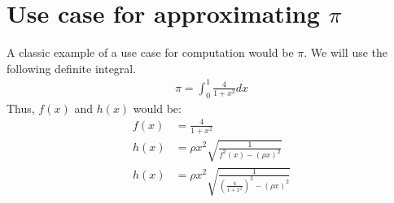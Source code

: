 \documentclass[letterpaper, 12pt]{article}
\begin{document}
\section{Use case for approximating $\pi$}
A classic example of a use case for computation would be $\pi$.
We will use the following definite integral.
\begin{align*}
    \pi = \int_0^1 \frac{4}{1 + x^2}dx
\end{align*}
Thus, $f(x)$ and $h(x)$ would be:
\begin{align*}
    f(x) &= \frac{4}{1 + x^2}\\
    h(x) &= \rho x^2\sqrt{\frac{1}{f^2(x) - (\rho x)^2}}\\
    h(x) &= \rho x^2\sqrt{\frac{1}{(\frac{4}{1 + x^2})^2 - (\rho x)^2}}\\
\end{align*}
\end{document}
